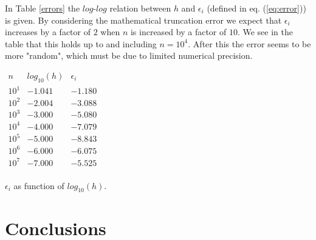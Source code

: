 \documentclass[12pt, a4paper]{article}
\begin{document}
In Table \ref{errors} the $log$-$log$ relation between $h$ and $\epsilon_i$ (defined in eq. 
(\ref{eq:error})) is given. By considering the mathematical truncation error we expect that $\epsilon_i$ 
increases by a factor of $2$ when $n$ is increased by a factor of $10$. We see in the table that this 
holds up to and including $n=10^4$. After this the error seems to be more "random", which must be due to 
limited numerical precision.

\begin{table}[ht!]
\begin{center}
$\begin{array}{c|c|c} 
n & log_{10}(h) & \epsilon_i \\ \hline 
10^1 & -1.041 & -1.180 \\ 
10^2 & -2.004 & -3.088 \\ 
10^3 & -3.000 & -5.080 \\  
10^4 & -4.000 & -7.079 \\ 
10^5 & -5.000 & -8.843 \\ 
10^6 & -6.000 & -6.075 \\ 
10^7 & -7.000 & -5.525 \\ 
\end{array}$
\end{center}
\caption{$\epsilon_i$ as function of $log_{10}(h)$.}
\label{errors}
\end{table}



\section{Conclusions}
\end{document}
